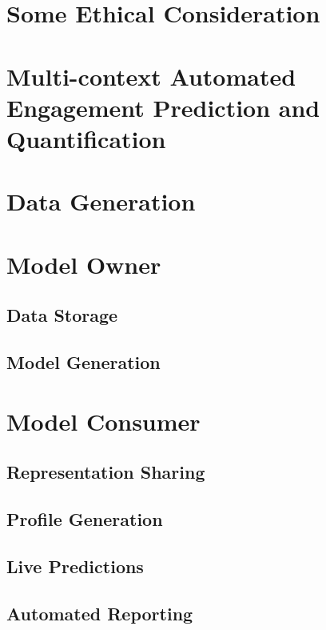 \section{Some Ethical Consideration}
\label{industry_needs}
\lorem

\section{Multi-context Automated Engagement Prediction and Quantification}
\label{industry_needs}

\section{Data Generation}
\lorem
\section{Model Owner}
\lorem
\subsection{Data Storage}
\lorem
\subsection{Model Generation}
\lorem
\section{Model Consumer}
\lorem
\subsection{Representation Sharing}
\lorem
\subsection{Profile Generation}
\lorem
\subsection{Live Predictions}
\lorem
\subsection{Automated Reporting}
\lorem

